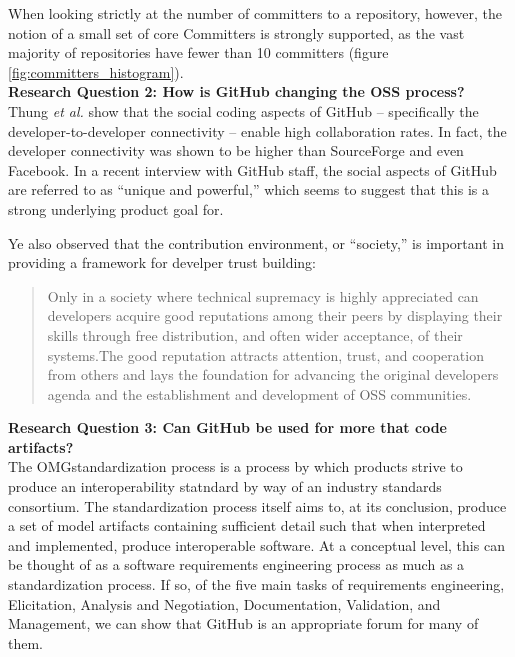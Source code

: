 \documentclass{proc}
\begin{document}
{{{{{When looking strictly at the number of committers to a repository, however, the notion of a small set of core Committers is strongly supported, as the vast majority of repositories have fewer than 10 committers (figure \ref{fig:committers_histogram}).\\

\textbf{Research Question 2: How is GitHub changing the OSS process?}\\
Thung \textit{et al.} show that the social coding aspects of GitHub -- specifically the developer-to-developer connectivity -- enable high collaboration rates.\cite{thung2013network} In fact, the developer connectivity was shown to be higher than SourceForge and even Facebook. In a recent interview with GitHub staff, the social aspects of GitHub are referred to as ``unique and powerful\cite{begel2013social},'' which seems to suggest that this is a strong underlying product goal for.

Ye also observed\cite{ye2003toward} that the contribution environment, or ``society,'' is important in providing a framework for develper trust building:
\begin{quote}
Only in a society where technical supremacy is highly appreciated can developers acquire good reputations among their peers by displaying their skills through free distribution, and often wider acceptance, of their systems.The good reputation attracts attention, trust, and cooperation from others and lays the foundation for advancing the original developers agenda and the establishment and development of OSS communities. 
\end{quote}

\noindent \textbf{Research Question 3: Can GitHub be used for more that code artifacts?}\\
The OMG\textregistered standardization process is a process by which products strive to produce an interoperability statndard by way of an industry standards consortium.\cite{omgTechProcess}
The standardization process itself aims to, at its conclusion, produce a set of model artifacts containing sufficient detail such that when interpreted and implemented, produce interoperable software.
At a conceptual level, this can be thought of as a software requirements engineering process as much as a standardization process. If so,  of the five main tasks of requirements engineering, Elicitation, Analysis and Negotiation, Documentation, Validation, and Management,\cite{sommerville1998requirements} we can show that GitHub is an appropriate forum for many of them.

}}}}}
\end{document}

